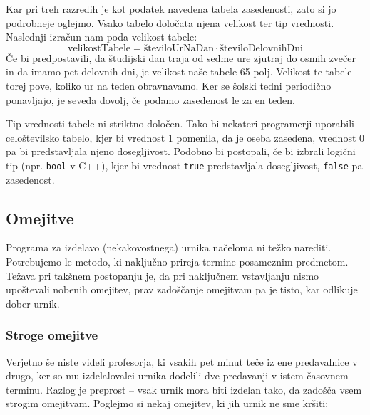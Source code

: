 \documentclass[a4paper,10pt]{article}
\begin{document}
\noindent
Kar pri treh razredih je kot podatek navedena tabela zasedenosti, zato si jo podrobneje
oglejmo. Vsako tabelo določata njena velikost ter tip vrednosti. Naslednji izračun nam
poda velikost tabele:
\[
   \text{velikostTabele} = \text{številoUrNaDan} \cdot \text{številoDelovnihDni}
\]
Če bi predpostavili, da študijski dan traja od sedme ure zjutraj do osmih zvečer in da
imamo pet delovnih dni, je velikost naše tabele 65 polj. Velikost te tabele torej pove,
koliko ur na teden obravnavamo. Ker se šolski tedni periodično ponavljajo, je seveda
dovolj, če podamo zasedenost le za en teden.


Tip vrednosti tabele ni striktno določen. Tako bi nekateri programerji uporabili
celoštevilsko tabelo, kjer bi vrednost 1 pomenila, da je oseba zasedena, vrednost 0
pa bi predstavljala njeno dosegljivost. Podobno bi postopali, če bi izbrali logični
tip (npr. \verb|bool| v C++), kjer bi vrednost \verb|true| predstavljala
dosegljivost, \verb|false| pa zasedenost.

\subsection{Omejitve}

Programa za izdelavo (nekakovostnega) urnika načeloma ni težko narediti. Potrebujemo
le metodo, ki naključno prireja termine posameznim predmetom. Težava pri takšnem postopanju
je, da pri naključnem vstavljanju nismo upoštevali nobenih omejitev, prav zadoščanje omejitvam
pa je tisto, kar odlikuje dober urnik.

\subsubsection{Stroge omejitve}

Verjetno še niste videli profesorja, ki vsakih pet minut teče iz ene predavalnice v drugo,
ker so mu izdelalovalci urnika dodelili dve predavanji v istem časovnem terminu. Razlog
je preprost -- vsak urnik mora biti izdelan tako, da zadošča vsem strogim omejitvam.
Poglejmo si nekaj omejitev, ki jih urnik ne sme kršiti:

\end{document}
